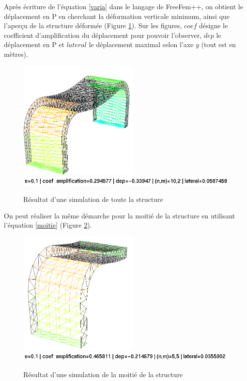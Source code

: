     Après écriture de l'équation \ref{varia} dans le langage de FreeFem++, on obtient le déplacement en P en cherchant la déformation verticale minimum, ainsi que 
    l'aperçu de la structure déformée (Figure \ref{fig:simu_def}). 
    Sur les figures, $coef$ désigne le coefficient d'amplification du déplacement pour pouvoir l'observer, $dep$ le déplacement en P et $lateral$ 
    le déplacement maximal selon l'axe $y$ (tout est en mètres).
    
    \begin{figure}        
        \begin{center}
        
            \includegraphics[width=6cm]{imgs/all_simu.PNG}
            \includegraphics[width=12cm]{imgs/all_simu_label.PNG}
            \caption{Résultat d'une simulation de toute la structure}
            \label{fig:simu_def}
        
        \end{center}
    \end{figure}

    On peut réaliser la même démarche pour la moitié de la structure en utilisant l'équation \ref{moitie} (Figure \ref{fig:simu_def_moitie}).

    \begin{figure}        
        \begin{center}
        
            \includegraphics[width=6cm]{imgs/half_simu.PNG}
            \includegraphics[width=12cm ]{imgs/half_simu_label.PNG}
            \caption{Résultat d'une simulation de la moitié de la structure}
            \label{fig:simu_def_moitie}
        
        \end{center}
    \end{figure}


